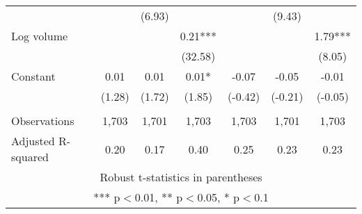 \documentclass[]{article}
\begin{document}
\begin{tabular}{lcccccc}
 &  & (6.93) &  &  & (9.43) &  \\
Log volume &  &  & 0.21*** &  &  & 1.79*** \\
 &  &  & (32.58) &  &  & (8.05) \\
Constant & 0.01 & 0.01 & 0.01* & -0.07 & -0.05 & -0.01 \\
 & (1.28) & (1.72) & (1.85) & (-0.42) & (-0.21) & (-0.05) \\
 &  &  &  &  &  &  \\
Observations & 1,703 & 1,701 & 1,703 & 1,703 & 1,701 & 1,703 \\
 Adjusted R-squared & 0.20 & 0.17 & 0.40 & 0.25 & 0.23 & 0.23 \\ \hline
\multicolumn{7}{c}{ Robust t-statistics in parentheses} \\
\multicolumn{7}{c}{ *** p$<$0.01, ** p$<$0.05, * p$<$0.1} \\
\end{tabular}
\end{document}
